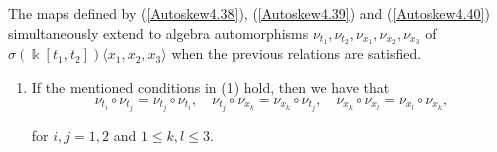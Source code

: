 \documentclass[10pt,a4paper]{amsart}
\begin{document}
\begin{proposition}
\begin{enumerate}
The maps defined by {\rm (}\ref{Autoskew4.38}{\rm )}, {\rm (}\ref{Autoskew4.39}{\rm )} and {\rm (}\ref{Autoskew4.40}{\rm )} simultaneously extend to algebra automorphisms $\nu_{t_1}, \nu_{t_2}, \nu _{x_1}, \nu_{x_2}, \nu_{x_3}$ of $\sigma(\Bbbk[t_1, t_2])\langle x_1, x_2, x_3\rangle$ when the previous relations are satisfied.
\end{enumerate}
\begin{enumerate}
\item [\rm (2)] If the mentioned conditions in (1) hold, then we have that 
\begin{equation}\label{Eq1skew23}
   \nu_{t_i} \circ \nu_{t_j} = \nu_{t_j} \circ \nu_{t_i}, \quad \nu_{t_j} \circ \nu_{x_k} = \nu_{x_k} \circ \nu_{t_j}, \quad \nu_{x_k} \circ \nu_{x_l} = \nu_{x_l} \circ \nu_{x_k}, 
\end{equation}

for $i, j = 1, 2$ and $1\le k, l \leq 3$.
\end{enumerate}
\end{proposition}
\end{document}

